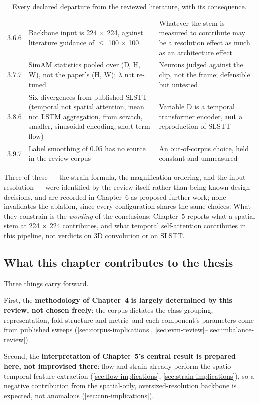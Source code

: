 \begin{table}[htbp]
\begin{tabular}{p{0.9cm} p{5.8cm} p{5.8cm}}
		3.6.6 & Backbone input is 224 $\times$ 224, against literature guidance of $\leq$ 100 $\times$ 100 & Whatever the stem is measured to contribute may be a resolution effect as much as an architecture effect \\
		3.7.7 & SimAM statistics pooled over (D, H, W), not the paper's (H, W); $\lambda$ not re-tuned & Neurons judged against the clip, not the frame; defensible but untested \\
		3.8.6 & Six divergences from published SLSTT (temporal not spatial attention, mean not LSTM aggregation, from scratch, smaller, sinusoidal encoding, short-term flow) & Variable D is a temporal transformer encoder, \textbf{not} a reproduction of SLSTT \\
		3.9.7 & Label smoothing of 0.05 has no source in the review corpus & An out-of-corpus choice, held constant and unmeasured \\
		\hline
	\end{tabular}
	\caption[Every declared departure from the reviewed literature]{Every declared departure from the reviewed literature, with its consequence.}
	\label{tab:divergence-ledger}
\end{table}

Three of these --- the strain formula, the magnification ordering, and the input resolution --- were identified by the review itself rather than being known design decisions, and are recorded in Chapter~6 as proposed further work; none invalidates the ablation, since every configuration shares the same choices. What they constrain is the \textit{wording} of the conclusions: Chapter~5 reports what a spatial stem at 224 $\times$ 224 contributes, and what temporal self-attention contributes in this pipeline, not verdicts on 3D convolution or on SLSTT.

\subsection{What this chapter contributes to the thesis}
\label{sec:ch3-contribution}

Three things carry forward.

First, the \textbf{methodology of Chapter~4 is largely determined by this review, not chosen freely}: the corpus dictates the class grouping, representation, fold structure and metric, and each component's parameters come from published sweeps (\autoref{sec:corpus-implications}, \autoref{sec:evm-review}--\autoref{sec:imbalance-review}).

Second, the \textbf{interpretation of Chapter~5's central result is prepared here, not improvised there}: flow and strain already perform the spatio-temporal feature extraction (\autoref{sec:flow-implications}, \autoref{sec:strain-implications}), so a negative contribution from the spatial-only, oversized-resolution backbone is expected, not anomalous (\autoref{sec:cnn-implications}).

